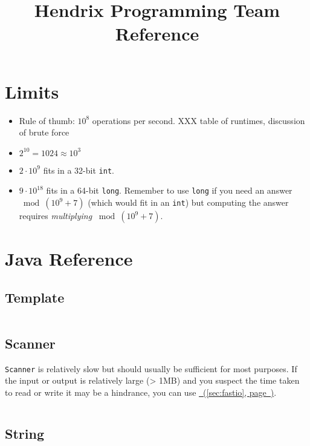 \documentclass[10pt]{article}
\newcommand{\code}[1]{\inputminted[fontsize=\normalsize]{java}{code/#1}}
\newcommand*{\fulllink}[1]{\hyperref[{#1}]{\nameref*{#1}~(\ref*{#1}, page~\pageref*{#1})}}
\begin{document}
\title{Hendrix Programming Team Reference}

\maketitle

\tableofcontents
\newpage

\section{Limits}

\begin{itemize}
\item Rule of thumb: $10^8$ operations per second.
  XXX table of runtimes, discussion of brute force
\item $2^{10} = 1024 \approx 10^3$
\item $2 \cdot 10^9$ fits in a 32-bit \texttt{int}.
\item $9 \cdot 10^{18}$ fits in a 64-bit \texttt{long}.  Remember to
  use \texttt{long} if you need an answer $\bmod (10^9 + 7)$ (which
  would fit in an \texttt{int}) but computing the answer requires
  \emph{multiplying} $\bmod (10^9 + 7)$.
\end{itemize}

\section{Java Reference}

\subsection{Template}

\code{java/Template.java}

\subsection{Scanner}

\texttt{Scanner} is relatively slow but should usually be sufficient
for most purposes.  If the input or output is relatively large (> 1MB)
and you suspect the time taken to read or write it may be a hindrance,
you can use \fulllink{sec:fastio}.

\code{java/ScannerExample.java}

\subsection{String}
\end{document}

